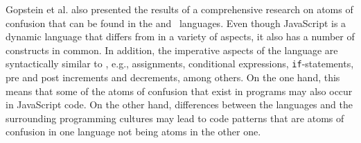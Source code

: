 
Gopstein et al. \cite{DBLP:conf/sigsoft/GopsteinIYDZYC17} also presented the results of a comprehensive research on atoms of confusion that can be found in the \clang and \cpplang~languages. Even though JavaScript is a dynamic language that differs from \clang in a variety of aspects, it also has a number of constructs in common. In addition, the imperative aspects of the language are syntactically similar to \clang, e.g., assignments, conditional expressions, \texttt{if}-statements, pre and post increments and decrements, among others. On the one hand, this means that some of the atoms of confusion that exist in \clang programs may also occur in JavaScript code. On the other hand, differences between the languages and the surrounding programming cultures may lead to code patterns that are atoms of confusion in one language not being atoms in the other one.


